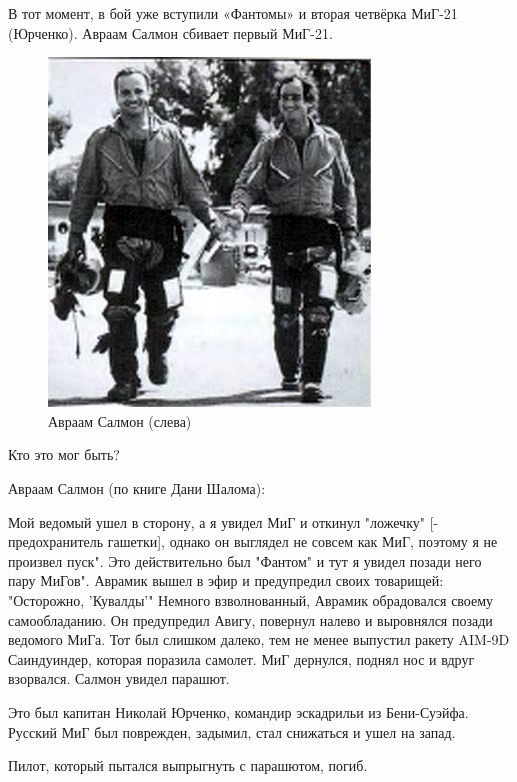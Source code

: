 В тот момент, в бой уже вступили «Фантомы» и вторая четвёрка МиГ-21 (Юрченко). Авраам Салмон сбивает первый МиГ-21. 

\begin{figure}[h!tb] 
	\centering\includegraphics[scale=0.25]{Dolina_5/NX7h3zem5P0.jpg}
	\caption{Авраам Салмон (слева)}%
\end{figure}

Кто это мог быть?

Авраам Салмон (по книге Дани Шалома):

\begin{textcitation}
	Мой ведомый ушел в сторону, а я увидел МиГ и откинул "ложечку" [- предохранитель гашетки], однако он выглядел не совсем как МиГ, поэтому я не произвел пуск". Это действительно был "Фантом" и тут я увидел позади него пару МиГов". Аврамик вышел в эфир и предупредил своих товарищей: "Осторожно, 'Кувалды'" Немного взволнованный, Аврамик обрадовался своему самообладанию. Он предупредил Авигу, повернул налево и выровнялся позади ведомого МиГа. Тот был слишком далеко, тем не менее выпустил ракету AIM-9D Саиндуиндер, которая поразила самолет. МиГ дернулся, поднял нос и вдруг взорвался. Салмон увидел парашют.
	
	Это был капитан Николай Юрченко, командир эскадрильи из Бени-Суэйфа. Русский МиГ был поврежден, задымил, стал снижаться и ушел на запад.
	
	Пилот, который пытался выпрыгнуть с парашютом, погиб.
\end{textcitation}

